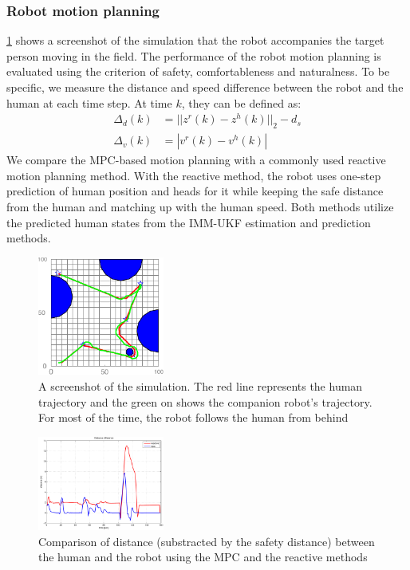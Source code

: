 \documentclass[letterpaper, 10 pt, conference]{ieeeconf}
\begin{document}
\subsubsection{Robot motion planning}
\cref{fig:robot_accom} shows a screenshot of the simulation that the robot accompanies the target person moving in the field.
The performance of the robot motion planning is evaluated using the criterion of safety, comfortableness and naturalness.
To be specific, we measure the distance and speed difference between the robot and the human at each time step.
At time $k$, they can be defined as:
\begin{subequations}
\begin{align}
\Delta_d(k)&=||z^r(k)-z^h(k)||_2-d_s\label{eqn:err_d}\\
\Delta_v(k)&=|v^r(k)-v^h(k)|\label{eqn:err_v}
\end{align}
\end{subequations}
We compare the MPC-based motion planning with a commonly used reactive motion planning method. %
With the reactive method, the robot uses one-step prediction of human position and heads for it while keeping the safe distance from the human and matching up with the human speed.
Both methods utilize the predicted human states from the IMM-UKF estimation and prediction methods.
\begin{figure}
\centering
\includegraphics[width=0.37\textwidth]{figures/sim_traj.pdf}
\caption{A screenshot of the simulation. The red line represents the human trajectory and the green on shows the companion robot's trajectory. For most of the time, the robot follows the human from behind}
\label{fig:robot_accom}
\end{figure}
\begin{figure}
\centering
\includegraphics[width=0.37\textwidth]{figures/mpc_vs_reac_dis_diff.pdf}
\caption{Comparison of distance (substracted by the safety distance) between the human and the robot using the MPC and the reactive methods}
\label{fig:err_d}
\end{figure}
\end{document}
